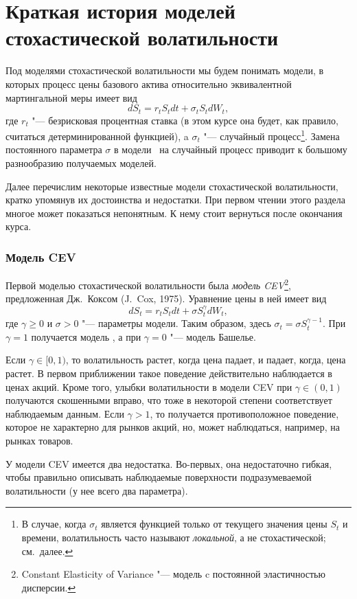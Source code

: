 \section{Краткая история моделей стохастической волатильности}

Под моделями стохастической волатильности мы будем понимать модели, в которых процесс цены базового актива относительно эквивалентной мартингальной меры имеет вид
\[
dS_t = r_tS_t dt + \sigma_t S_t dW_t,
\]
где $r_t$ "--- безрисковая процентная ставка (в этом курсе она будет, как правило, считаться детерминированной функцией), a $\sigma_t$ "--- случайный процесс\footnote{В случае, когда $\sigma_t$ является функцией только от текущего значения цены $S_t$ и времени, волатильность часто называют \emph{локальной}, а не стохастической; см.~далее.}.
Замена постоянного параметра $\sigma$ в модели \bs\ на случайный процесс приводит к большому разнообразию получаемых моделей. 

Далее перечислим некоторые известные модели стохастической волатильности, кратко упомянув их достоинства и недостатки.
При первом чтении этого раздела многое может показаться непонятным.
К нему стоит вернуться после окончания курса.

\subsubsection{Модель CEV}

Первой моделью стохастической волатильности была \emph{модель CEV}\footnote{Constant Elasticity of Variance "--- модель c постоянной эластичностью дисперсии.}, предложенная Дж.~Коксом (J.~Cox, 1975).
Уравнение цены в ней имеет вид
\[
d S_t = r_tS_t dt + \sigma S_t^\gamma d W_t,
\]
где $\gamma \ge 0$ и $\sigma>0$ "--- параметры модели. Таким образом, здесь $\sigma_t = \sigma S_t^{\gamma-1}$. 
При $\gamma=1$ получается модель \bs, а при $\gamma=0$ "--- модель Башелье.

Если $\gamma\in[0,1)$, то волатильность растет, когда цена падает, и падает, когда, цена растет.
В первом приближении такое поведение действительно наблюдается в ценах акций.
Кроме того, улыбки волатильности в модели CEV при $\gamma\in(0,1)$ получаются скошенными вправо, что тоже в некоторой степени соответствует наблюдаемым данным.
Если $\gamma>1$, то получается противоположное поведение, которое не характерно для рынков акций, но, может наблюдаться, например, на рынках товаров.

У модели CEV имеется два недостатка.
Во-первых, она недостаточно гибкая, чтобы правильно описывать наблюдаемые поверхности подразумеваемой волатильности (у нее всего два параметра).

